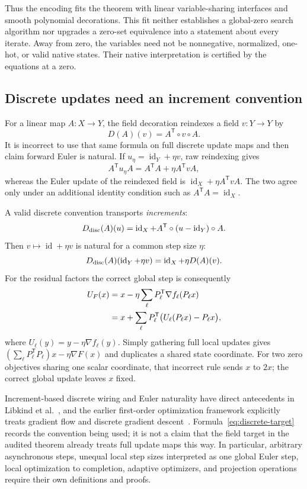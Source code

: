 \documentclass[11pt]{article}
\newcommand{\Id}{\operatorname{id}}
\theoremstyle{remark}
\begin{document}
Thus the encoding fits the theorem with linear variable-sharing interfaces and smooth polynomial decorations. This fit neither establishes a global-zero search algorithm nor upgrades a zero-set equivalence into a statement about every iterate. Away from zero, the variables need not be nonnegative, normalized, one-hot, or valid native states. Their native interpretation is certified by the equations at a zero.

\subsection{Discrete updates need an increment convention}

For a linear map $A:X\to Y$, the field decoration reindexes a field $v:Y\to Y$ by
\[
 D(A)(v)=A^{\mathsf T}\circ v\circ A.
\]
It is incorrect to use that same formula on full discrete update maps and then claim forward Euler is natural. If $u_\eta=\Id_Y+\eta v$, raw reindexing gives
\[
 A^{\mathsf T}u_\eta A=A^{\mathsf T}A+\eta A^{\mathsf T}vA,
\]
whereas the Euler update of the reindexed field is
$\Id_X+\eta A^{\mathsf T}vA$. The two agree only under an additional identity condition such as $A^{\mathsf T}A=\Id_X$.

A valid discrete convention transports \emph{increments}:
\begin{equation}\label{eq:discrete-target}
 D_{\rm disc}(A)(u)
 =\Id_X+A^{\mathsf T}\circ(u-\Id_Y)\circ A.
\end{equation}
Then $v\mapsto\Id+\eta v$ is natural for a common step size $\eta$:
\[
 D_{\rm disc}(A)(\Id_Y+\eta v)
 =\Id_X+\eta D(A)(v).
\]
For the residual factors the correct global step is consequently
\begin{align}
 U_F(x)&=x-\eta\sum_\ell P_\ell^{\mathsf T}\nabla f_\ell(P_\ell x)\notag\\
 &=x+\sum_\ell P_\ell^{\mathsf T}
       \bigl(U_\ell(P_\ell x)-P_\ell x\bigr),\label{eq:euler-assembly}
\end{align}
where $U_\ell(y)=y-\eta\nabla f_\ell(y)$. Simply gathering full local updates gives
$(\sum_\ell P_\ell^{\mathsf T}P_\ell)x-\eta\nabla F(x)$ and duplicates a shared state coordinate. For two zero objectives sharing one scalar coordinate, that incorrect rule sends $x$ to $2x$; the correct global update leaves $x$ fixed.

Increment-based discrete wiring and Euler naturality have direct antecedents in Libkind et al.~\cite{Libkind2022}, and the earlier first-order optimization framework explicitly treats gradient flow and discrete gradient descent~\cite{Hanks2024}. Formula~\eqref{eq:discrete-target} records the convention being used; it is not a claim that the field target in the audited theorem already treats full update maps this way. In particular, arbitrary asynchronous steps, unequal local step sizes interpreted as one global Euler step, local optimization to completion, adaptive optimizers, and projection operations require their own definitions and proofs.
\end{document}
